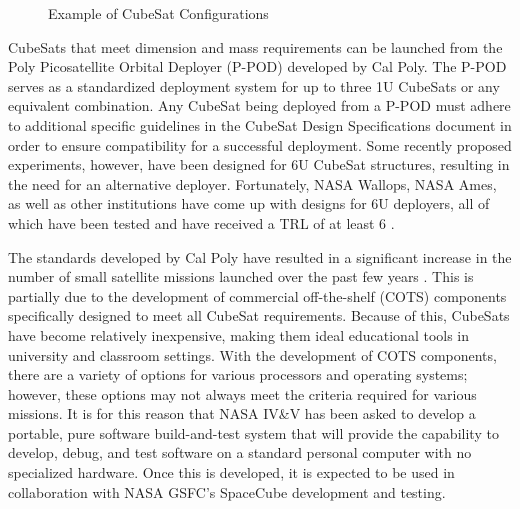 \documentclass[11pt]{article}
\begin{document}
\begin{figure}[ht!]
\centering
{}
\caption{Example of CubeSat Configurations\cite{configimage}}
\label{config}
\end{figure}

CubeSats that meet dimension and mass requirements can be launched from the Poly Picosatellite Orbital Deployer (P-POD) developed by Cal Poly.  The P-POD serves as a standardized deployment system for up to three 1U CubeSats or any equivalent combination.  Any CubeSat being deployed from a P-POD must adhere to additional specific guidelines in the CubeSat Design Specifications document in order to ensure compatibility for a successful deployment.  Some recently proposed experiments, however, have been designed for 6U CubeSat structures, resulting in the need for an alternative deployer.  Fortunately, NASA Wallops, NASA Ames, as well as other institutions have come up with designs for 6U deployers, all of which have been tested and have received a TRL of at least 6 \cite{SmSCTech}.

The standards developed by Cal Poly have resulted in a significant increase in the number of small satellite missions launched over the past few years \cite{MarketAssessment}.  This is partially due to the development of commercial off-the-shelf (COTS) components specifically designed to meet all CubeSat requirements.  Because of this, CubeSats have become relatively inexpensive, making them ideal educational tools in university and classroom settings.  With the development of COTS components, there are a variety of options for various processors and operating systems; however, these options may not always meet the criteria required for various missions.  It is for this reason that NASA IV\&V has been asked to develop a portable, pure software build-and-test system that will provide the capability to develop, debug, and test software on a standard personal computer with no specialized hardware.  Once this is developed, it is expected to be used in collaboration with NASA GSFC's SpaceCube development and testing. 
\end{document}
